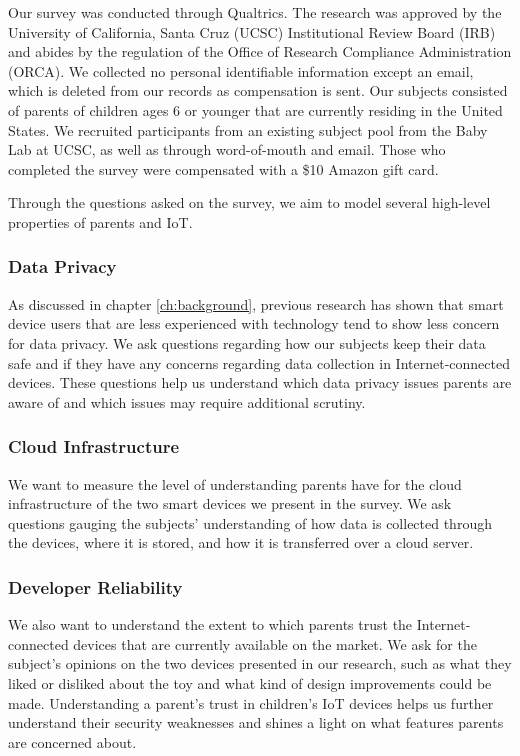 \documentclass[12pt]{ucthesis}
\begin{document}
Our survey was conducted through Qualtrics. The research was approved by the University of California, Santa Cruz (UCSC) Institutional Review Board (IRB) and abides by the regulation of the Office of Research Compliance Administration (ORCA). We collected no personal identifiable information except an email, which is deleted from our records as compensation is sent. Our subjects consisted of parents of children ages 6 or younger that are currently residing in the United States. We recruited participants from an existing subject pool from the Baby Lab at UCSC, as well as through word-of-mouth and email. Those who completed the survey were compensated with a \$10 Amazon gift card.

Through the questions asked on the survey, we aim to model several high-level properties of parents and IoT.

\subsubsection{Data Privacy}
As discussed in chapter \ref{ch:background}, previous research has shown that smart device users that are less experienced with technology tend to show less concern for data privacy. We ask questions regarding how our subjects keep their data safe and if they have any concerns regarding data collection in Internet-connected devices. These questions help us understand which data privacy issues parents are aware of and which issues may require additional scrutiny.

\subsubsection{Cloud Infrastructure}
We want to measure the level of understanding parents have for the cloud infrastructure of the two smart devices we present in the survey. We ask questions gauging the subjects' understanding of how data is collected through the devices, where it is stored, and how it is transferred over a cloud server. 

\subsubsection{Developer Reliability}
We also want to understand the extent to which parents trust the Internet-connected devices that are currently available on the market. We ask for the subject's opinions on the two devices presented in our research, such as what they liked or disliked about the toy and what kind of design improvements could be made. Understanding a parent's trust in children's IoT devices helps us further understand their security weaknesses and shines a light on what features parents are concerned about.
\end{document}
